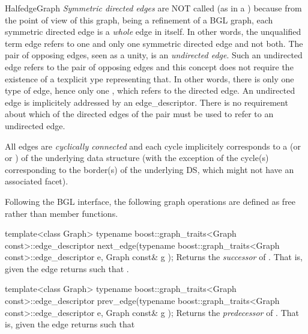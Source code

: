 \begin{ccRefConcept}{HalfedgeGraph}
{\em Symmetric directed edges} are NOT called  (as in a ) because from the point of view of this graph, being a refinement of a BGL graph, each symmetric directed edge is a {\em whole} edge in itself. In other words, the unqualified term edge refers to one and only one symmetric directed edge and not both. The pair of opposing edges, seen as a unity, is an {\em undirected edge}. Such an undirected edge refers to the pair of opposing edges and this concept does not require the existence of a texplicit ype representing that. In other words, there is only one type of edge, hence only one , which refers to the directed edge. An undirected edge is implicitely addressed by an edge\_descriptor. There is no requirement about which of the directed edges of the pair must be used to refer to an undirected edge.

All edges are {\em cyclically connected} and each cycle implicitely corresponds to a  (or  or ) of the underlying data structure (with the exception of the cycle(s) corresponding to the border(s) of the underlying DS, which might not have an associated facet).


\ccRefines
{}

\ccTypes
  
\ccOperations

Following the BGL interface, the following graph operations are defined as free rather than member functions.

  \ccFunction
  {template<class Graph>
  typename boost::graph_traits<Graph const>::edge_descriptor 
  next_edge(typename boost::graph_traits<Graph const>::edge_descriptor e, Graph const& g );
  }
  {Returns the {\em successor} of .
  That is, given the edge  returns  such that .\\
  [non-const version ommited]
  }
  
  \ccFunction
  {template<class Graph>
  typename boost::graph_traits<Graph const>::edge_descriptor 
  prev_edge(typename boost::graph_traits<Graph const>::edge_descriptor e, Graph const& g );
  }
  {Returns the {\em predecessor} of .
  That is, given the edge  returns  such that \\
  [non-const version ommited]
  }
  

\end{ccRefConcept}
